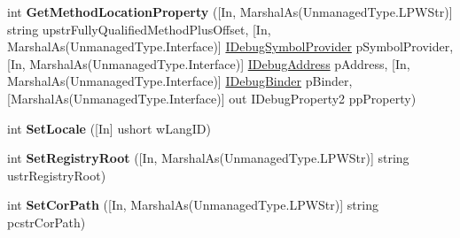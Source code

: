 \begin{DoxyCompactItemize}
\item 
\hypertarget{interface_microsoft_1_1_visual_studio_1_1_debugger_1_1_interop_e_e_1_1_i_debug_expression_evaluator3_a04383ee5cfbaea220f595d3c762a3d2f}{int {\bfseries Get\+Method\+Location\+Property} (\mbox{[}In, Marshal\+As(Unmanaged\+Type.\+L\+P\+W\+Str)\mbox{]} string upstr\+Fully\+Qualified\+Method\+Plus\+Offset, \mbox{[}In, Marshal\+As(Unmanaged\+Type.\+Interface)\mbox{]} \hyperlink{interface_microsoft_1_1_visual_studio_1_1_debugger_1_1_interop_e_e_1_1_i_debug_symbol_provider}{I\+Debug\+Symbol\+Provider} p\+Symbol\+Provider, \mbox{[}In, Marshal\+As(Unmanaged\+Type.\+Interface)\mbox{]} \hyperlink{interface_microsoft_1_1_visual_studio_1_1_debugger_1_1_interop_e_e_1_1_i_debug_address}{I\+Debug\+Address} p\+Address, \mbox{[}In, Marshal\+As(Unmanaged\+Type.\+Interface)\mbox{]} \hyperlink{interface_microsoft_1_1_visual_studio_1_1_debugger_1_1_interop_e_e_1_1_i_debug_binder}{I\+Debug\+Binder} p\+Binder, \mbox{[}Marshal\+As(Unmanaged\+Type.\+Interface)\mbox{]} out I\+Debug\+Property2 pp\+Property)}\label{interface_microsoft_1_1_visual_studio_1_1_debugger_1_1_interop_e_e_1_1_i_debug_expression_evaluator3_a04383ee5cfbaea220f595d3c762a3d2f}

\item 
\hypertarget{interface_microsoft_1_1_visual_studio_1_1_debugger_1_1_interop_e_e_1_1_i_debug_expression_evaluator3_aab969b572207d9cfab73eb9460b27164}{int {\bfseries Set\+Locale} (\mbox{[}In\mbox{]} ushort w\+Lang\+I\+D)}\label{interface_microsoft_1_1_visual_studio_1_1_debugger_1_1_interop_e_e_1_1_i_debug_expression_evaluator3_aab969b572207d9cfab73eb9460b27164}

\item 
\hypertarget{interface_microsoft_1_1_visual_studio_1_1_debugger_1_1_interop_e_e_1_1_i_debug_expression_evaluator3_aa38cc1d538c2b290a969dcf4200d042d}{int {\bfseries Set\+Registry\+Root} (\mbox{[}In, Marshal\+As(Unmanaged\+Type.\+L\+P\+W\+Str)\mbox{]} string ustr\+Registry\+Root)}\label{interface_microsoft_1_1_visual_studio_1_1_debugger_1_1_interop_e_e_1_1_i_debug_expression_evaluator3_aa38cc1d538c2b290a969dcf4200d042d}

\item 
\hypertarget{interface_microsoft_1_1_visual_studio_1_1_debugger_1_1_interop_e_e_1_1_i_debug_expression_evaluator3_a9ea90745bbf176be3e5271fd5c85d748}{int {\bfseries Set\+Cor\+Path} (\mbox{[}In, Marshal\+As(Unmanaged\+Type.\+L\+P\+W\+Str)\mbox{]} string pcstr\+Cor\+Path)}\label{interface_microsoft_1_1_visual_studio_1_1_debugger_1_1_interop_e_e_1_1_i_debug_expression_evaluator3_a9ea90745bbf176be3e5271fd5c85d748}


\end{DoxyCompactItemize}
